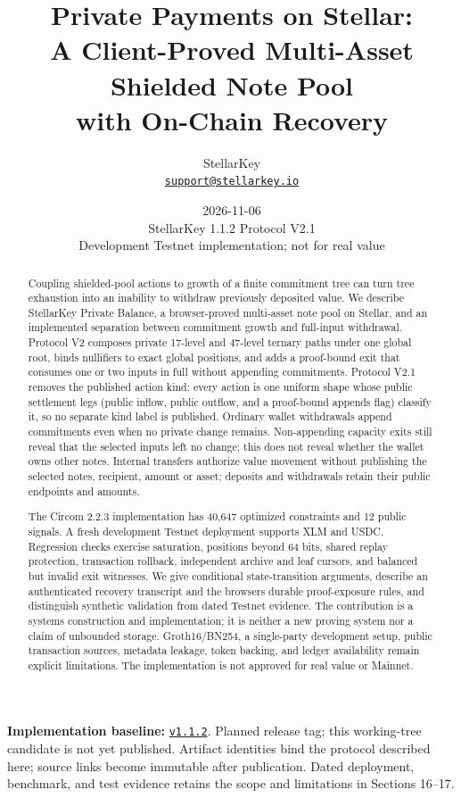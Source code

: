 \documentclass[11pt,letterpaper]{article}
\title{\textbf{Private Payments on Stellar:}\\[3pt]
A Client-Proved Multi-Asset Shielded Note Pool\\
with On-Chain Recovery}
\author{StellarKey\\\small\href{mailto:support@stellarkey.io}{\texttt{support@stellarkey.io}}}
\date{2026-11-06\\[5pt]
\small StellarKey 1.1.2 \textperiodcentered{} Protocol V2.1\\
\small Development Testnet implementation; not for real value}
\begin{document}
\maketitle
\begin{abstract}
Coupling shielded-pool actions to growth of a finite commitment tree can
turn tree exhaustion into an inability to withdraw previously deposited
value. We describe StellarKey Private Balance, a browser-proved
multi-asset note pool on Stellar, and an implemented separation between
commitment growth and full-input withdrawal. Protocol V2 composes
private 17-level and 47-level ternary paths under one global root, binds
nullifiers to exact global positions, and adds a proof-bound exit that
consumes one or two inputs in full without appending commitments.
Protocol V2.1 removes the published action kind: every action is one
uniform shape whose public settlement legs (public inflow, public
outflow, and a proof-bound appends flag) classify it, so no separate
kind label is published. Ordinary wallet withdrawals append commitments
even when no private change remains. Non-appending capacity exits still
reveal that the selected inputs left no change; this does not reveal
whether the wallet owns other notes. Internal transfers authorize value
movement without publishing the selected notes, recipient, amount or
asset; deposits and withdrawals retain their public endpoints and
amounts.

The Circom 2.2.3 implementation has 40,647 optimized constraints and 12
public signals. A fresh development Testnet deployment supports XLM and
USDC. Regression checks exercise saturation, positions beyond 64 bits,
shared replay protection, transaction rollback, independent archive and
leaf cursors, and balanced but invalid exit witnesses. We give
conditional state-transition arguments, describe an authenticated
recovery transcript and the browser\textquotesingle s durable
proof-exposure rules, and distinguish synthetic validation from dated
Testnet evidence. The contribution is a systems construction and
implementation; it is neither a new proving system nor a claim of
unbounded storage. Groth16/\allowbreak{}BN254, a single-party
development setup, public transaction sources, metadata leakage, token
backing, and ledger availability remain explicit limitations. The
implementation is not approved for real value or Mainnet.

\end{abstract}
\vspace{0.5em}
{\small\textbf{Implementation baseline:}
\href{https://github.com/stellarchain/io.stellarkey/tree/v1.1.2}{\texttt{v1.1.2}}.
Planned release tag; this working-tree candidate is not yet published. Artifact identities bind
the protocol described here; source links become immutable after publication. Dated deployment,
benchmark, and test evidence retains the scope and limitations in Sections 16--17.}
\clearpage
\begingroup
\small
\setlength{\parskip}{0pt}
\tableofcontents
\endgroup
\clearpage
\end{document}
